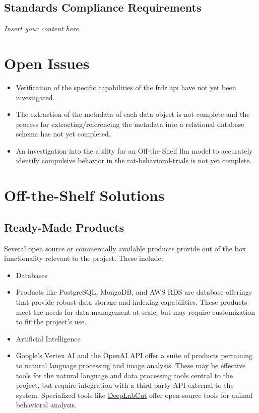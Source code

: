 \documentclass[12pt]{article}
\newcommand{\lips}{\textit{Insert your content here.}}
\begin{document}
\subsection{Standards Compliance Requirements}
\lips

\section{Open Issues}

\begin{itemize}
    \item Verification of the specific capabilities of the \gls{frdr} \gls{api} have not yet been investigated.
    \item The extraction of the metadata of each data object is not complete and the process for extracting/referencing the metadata
    into a relational database schema has not yet completed.
    \item An investigation into the ability for an Off-the-Shelf \gls{llm} model to accurately identify compulsive behavior in the
    \gls{rat-behavioral-trials} is not yet complete.
\end{itemize}

\section{Off-the-Shelf Solutions}
\subsection{Ready-Made Products}

Several open source or commercially available products provide out of the box functionality relevant to the project. These include: 

\begin{itemize}
    \item Databases 
    \item[] Products like PostgreSQL, MongoDB, and AWS RDS are database offerings that provide robust data storage and indexing capabilities. These products meet the needs for data management at scale, but may require customization to fit the project's use. 
    \item Artificial Intelligence 
    \item[] Google's Vertex AI and the OpenAI API offer a suite of products pertaining to natural language processing and image analysis. These may be effective tools for the natural language and data processing tools central to the project, but require integration with a third party API external to the system. Specialized tools like \href{https://github.com/DeepLabCut/DeepLabCut}{DeepLabCut} offer open-source tools for animal behavioral analysis. 

\end{itemize}
\end{document}
